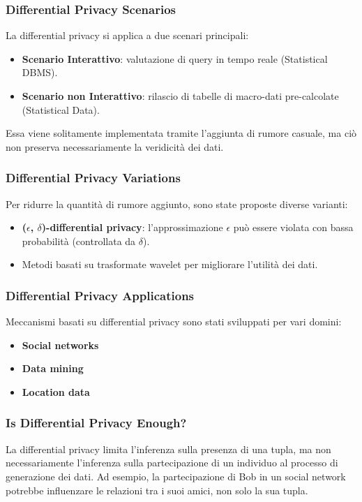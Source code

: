 \documentclass{report}
\begin{document}
\subsubsection{ Differential Privacy Scenarios}
La differential privacy si applica a due scenari principali:
\begin{itemize}
    \item \textbf{Scenario Interattivo}: valutazione di query in tempo reale (Statistical DBMS).
    \item \textbf{Scenario non Interattivo}: rilascio di tabelle di macro-dati pre-calcolate (Statistical Data).
\end{itemize}
Essa viene solitamente implementata tramite l'aggiunta di rumore casuale, ma ciò non preserva necessariamente la veridicità dei dati.

\subsubsection{ Differential Privacy Variations}
Per ridurre la quantità di rumore aggiunto, sono state proposte diverse varianti:
\begin{itemize}
    \item \textbf{($\epsilon$, $\delta$)-differential privacy}: l'approssimazione $\epsilon$ può essere violata con bassa probabilità (controllata da $\delta$).
    \item Metodi basati su trasformate wavelet per migliorare l'utilità dei dati.
\end{itemize}

\subsubsection{ Differential Privacy Applications}
Meccanismi basati su differential privacy sono stati sviluppati per vari domini:
\begin{itemize}
    \item \textbf{Social networks} 
    \item \textbf{Data mining} 
    \item \textbf{Location data}
\end{itemize}

\subsubsection{ Is Differential Privacy Enough?}
La differential privacy limita l'inferenza sulla presenza di una tupla, ma non necessariamente l'inferenza sulla partecipazione di un individuo al processo di generazione dei dati. 
Ad esempio, la partecipazione di Bob in un social network potrebbe influenzare le relazioni tra i suoi amici, non solo la sua tupla.
\end{document}
